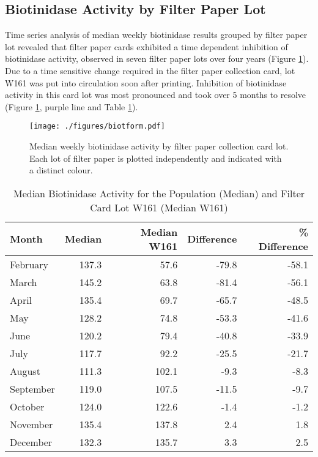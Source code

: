 \documentclass[review]{elsarticle}
\begin{document}
\clearpage

\subsection*{Biotinidase Activity by Filter Paper Lot}
\label{sec:orgabaa787}
Time series analysis of median weekly biotinidase results grouped by
filter paper lot revealed that filter paper cards exhibited a time
dependent inhibition of biotinidase activity, observed in seven filter
paper lots over four years (Figure \ref{fig:org1f06c0f}). Due to a time sensitive
change required in the filter paper collection card, lot W161 was put into
circulation soon after printing. Inhibition of biotinidase activity in
this card lot was most pronounced and took over 5 months to resolve
(Figure \ref{fig:org1f06c0f}, purple line and Table \ref{tab:w161_months}).

\begin{figure}[htbp]
\centering
\texttt{[image: ./figures/biotform.pdf]}
\caption{\label{fig:org1f06c0f}Median weekly biotinidase activity by filter paper collection card lot. Each lot of filter paper is plotted independently and indicated with a distinct colour.}
\end{figure}

\clearpage

\begin{table}[ht]
\centering
\begin{tabular}{lrrrr}
  \hline
Month & Median & Median W161 & Difference & \% Difference \\ 
  \hline
February & 137.3 & 57.6 & -79.8 & -58.1 \\ 
  March & 145.2 & 63.8 & -81.4 & -56.1 \\ 
  April & 135.4 & 69.7 & -65.7 & -48.5 \\ 
  May & 128.2 & 74.8 & -53.3 & -41.6 \\ 
  June & 120.2 & 79.4 & -40.8 & -33.9 \\ 
  July & 117.7 & 92.2 & -25.5 & -21.7 \\ 
  August & 111.3 & 102.1 & -9.3 & -8.3 \\ 
  September & 119.0 & 107.5 & -11.5 & -9.7 \\ 
  October & 124.0 & 122.6 & -1.4 & -1.2 \\ 
  November & 135.4 & 137.8 & 2.4 & 1.8 \\ 
  December & 132.3 & 135.7 & 3.3 & 2.5 \\ 
   \hline
\end{tabular}
\caption{Median Biotinidase Activity for the Population (Median) and Filter Card Lot W161 (Median W161)} 
\label{tab:w161_months}
\end{table}
\end{document}
